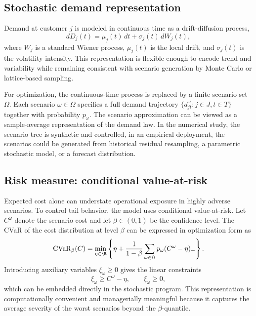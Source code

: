 \subsection{Stochastic demand representation}
Demand at customer $j$ is modeled in continuous time as a drift-diffusion process,
\begin{equation}
 dD_j(t)=\mu_j(t)\,dt+\sigma_j(t)\,dW_j(t),
\end{equation}
where $W_j$ is a standard Wiener process, $\mu_j(t)$ is the local drift, and $\sigma_j(t)$ is the volatility intensity. This representation is flexible enough to encode trend and variability while remaining consistent with scenario generation by Monte Carlo or lattice-based sampling.

For optimization, the continuous-time process is replaced by a finite scenario set $\Omega$. Each scenario $\omega\in\Omega$ specifies a full demand trajectory $\{d_{jt}^{\omega}:j\in J,t\in T\}$ together with probability $p_{\omega}$. The scenario approximation can be viewed as a sample-average representation of the demand law. In the numerical study, the scenario tree is synthetic and controlled, in an empirical deployment, the scenarios could be generated from historical residual resampling, a parametric stochastic model, or a forecast distribution.

\subsection{Risk measure: conditional value-at-risk}
Expected cost alone can understate operational exposure in highly adverse scenarios. To control tail behavior, the model uses conditional value-at-risk. Let $C^{\omega}$ denote the scenario cost and let $\beta\in(0,1)$ be the confidence level. The CVaR of the cost distribution at level $\beta$ can be expressed in optimization form as
\begin{equation}
\text{CVaR}_{\beta}(C)=\min_{\eta\in\R}\left\{\eta+\frac{1}{1-\beta}\sum_{\omega\in\Omega}p_{\omega}(C^{\omega}-\eta)_+\right\}.
\end{equation}
Introducing auxiliary variables $\xi_{\omega}\ge 0$ gives the linear constraints
\begin{equation}
\xi_{\omega}\ge C^{\omega}-\eta,\qquad \xi_{\omega}\ge 0,
\end{equation}
which can be embedded directly in the stochastic program. This representation is computationally convenient and managerially meaningful because it captures the average severity of the worst scenarios beyond the $\beta$-quantile.

